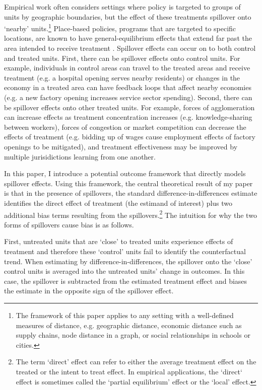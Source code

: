 \documentclass[11pt]{article}
\begin{document}
Empirical work often considers settings where policy is targeted to groups of units by geographic boundaries, but the effect of these treatments spillover onto `nearby' units.\footnote{The framework of this paper applies to any setting with a well-defined measures of distance, e.g. geographic distance, economic distance such as supply chains, node distance in a graph, or social relationships in schools or cities.} Place-based policies, programs that are targeted to specific locations, are known to have general-equilibrium effects that extend far past the area intended to receive treatment \citep{Kline_Moretti_2014b}. Spillover effects can occur on to both control and treated units. First, there can be spillover effects onto control units. For example, individuals in control areas can travel to the treated areas and receive treatment (e.g. a hospital opening serves nearby residents) or changes in the economy in a treated area can have feedback loops that affect nearby economies (e.g. a new factory opening increases service sector spending). Second, there can be spillover effects onto other treated units. For example, forces of agglomeration can increase effects as treatment concentration increases (e.g. knowledge-sharing between workers), forces of congestion or market competition can decrease the effects of treatment (e.g. bidding up of wages cause employment effects of factory openings to be mitigated), and treatment effectiveness may be improved by multiple jurisidictions learning from one another. 

In this paper, I introduce a potential outcome framework that directly models spillover effects. Using this framework, the central theoretical result of my paper is that in the presence of spillovers, the standard difference-in-differences estimate identifies the direct effect of treatment (the estimand of interest) plus two additional bias terms resulting from the spillovers.\footnote{The term `direct' effect can refer to either the average treatment effect on the treated or the intent to treat effect. In empirical applications, the `direct` effect is sometimes called the `partial equilibrium' effect or the `local' effect.} The intuition for why the two forms of spillovers cause bias is as follows. 

First, untreated units that are `close' to treated units experience effects of treatment and therefore these `control' units fail to identify the counterfactual trend. When estimating by difference-in-differences, the spillover onto the `close' control units is averaged into the untreated units' change in outcomes. In this case, the spillover is subtracted from the estimated treatment effect and biases the estimate in the opposite sign of the spillover effect. 
\end{document}
